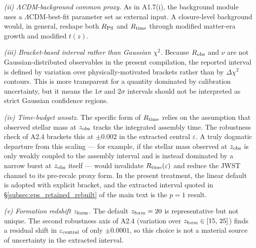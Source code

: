 \textit{(ii) $\Lambda$CDM-background common proxy.}
As in A1.7(i), the background module uses a $\Lambda$CDM-best-fit
parameter set as external input. A closure-level background
would, in general, reshape both $R_{\rm PS}$ and $R_{\rm time}$
through modified matter-era growth and modified $t(z)$.

\textit{(iii) Bracket-based interval rather than Gaussian
$\chi^2$.}
Because $R_{\rm obs}$ and $\nu$ are not Gaussian-distributed
observables in the present compilation, the reported interval is
defined by variation over physically-motivated brackets rather
than by $\Delta\chi^2$ contours. This is more transparent for a
quantity dominated by calibration uncertainty, but it means the
$1\sigma$ and $2\sigma$ intervals should not be interpreted as
strict Gaussian confidence regions.

\textit{(iv) Time-budget ansatz.}
The specific form of $R_{\rm time}$ relies on the assumption that
observed stellar mass at $z_{\rm obs}$ tracks the integrated
assembly time. The robustness check of A2.4 brackets this at
$\pm 0.002$ in the extracted central $\varepsilon$. A truly
dogmatic departure from this scaling --- for example, if the
stellar mass observed at $z_{\rm obs}$ is only weakly coupled to
the assembly interval and is instead dominated by a narrow burst
at $z_{\rm obs}$ itself --- would invalidate
$R_{\rm time}(\varepsilon)$ and reduce the JWST channel to its
pre-recalc proxy form. In the present treatment, the linear
default is adopted with explicit bracket, and the extracted
interval quoted in \S\ref{subsec:eps_retained_rebuilt} of the
main text is the $p=1$ result.

\textit{(v) Formation redshift $z_{\rm form}$.}
The default $z_{\rm form} = 20$ is representative but not unique.
The second robustness axis of A2.4 (variation over
$z_{\rm form} \in [15,\,25]$) finds a residual shift in
$\varepsilon_{\rm central}$ of only $\pm 0.0001$, so this choice is
not a material source of uncertainty in the extracted interval.

